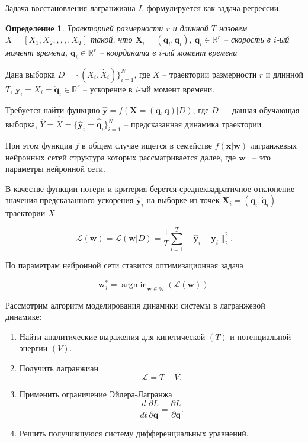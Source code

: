 \documentclass[a4paper, 12pt]{article}
\newcommand\argmin{\mathop{\arg\min}}
\newtheorem{definition}{Определение}
\begin{document}
Задача восстановления лагранжиана $L$ формулируется как задача регрессии.

\begin{definition} \label{definition:trajectory}
Траекторией размерности $r$ и длинной $T$ назовем $X = [X_1, X_2, ,,,, X_T]$ такой, что
$\mathbf{X}_i = (\mathbf{q}_i, \mathbf{\dot{q}}_i),\ \mathbf{\dot{q}}_i \in \mathbb{R}^r$ -- скорость в $i$-ый момент времени, $\mathbf{q}_i \in \mathbb{R}^r$ -- координата в $i$-ый момент времени
\end{definition}

Дана выборка
$D = \{(X_i, \dot{X_i})\}_{i=1}^N$, где $X$ -- траектории размерности $r$ и длинной $T$, $\mathbf{y}_i = \dot{X_i} = \ddot{\mathbf{q}}_i \in \mathbb{R}^r$ -- ускорение в $i$-ый момент времени.

Требуется найти функцию $\hat{\mathbf{y}}  = f(\mathbf{X} = (\mathbf{q}, \mathbf{\dot{q}}) | D)$, где $D$ ~-- данная обучающая выборка, $\hat{Y} =\hat{\dot{X}} = \{\hat{\mathbf{y}}_i = \hat{\ddot{\mathbf{q}}}_i\}_{i=1}^N$ -- предсказанная динамика траектории

При этом функция $f$ в общем случае ищется в семействе $f(\mathbf{x}|\mathbf{w})$ лагранжевых нейронных сетей структура которых рассматривается далее, где $\mathbf{w}$ ~-- это параметры нейронной сети.

В качестве функции потери и критерия берется среднеквадратичное отклонение значения предсказанного ускорения $\hat{\mathbf{y}}_i$ на выборке из точек $\mathbf{X}_i = (\mathbf{q}_i, \mathbf{\dot{q}}_i)$ траектории $X$

\begin{equation}
 \mathcal{L}(\textbf{w}) = \mathcal{L}(\mathbf{w} | D) = \frac{1}{T}\sum_{i=1}^{T} \| \hat{\mathbf{y}}_i - \mathbf{y}_i \|_2^2.
\end{equation}



По параметрам нейронной сети ставится оптимизационная задача

\begin{equation} 
\label{eq:opt_task}
\textbf{w}_j^* = \argmin_{\mathbf{w} \in \mathbb{W}} \left( \mathcal{L}(\textbf{w}) \right). 
\end{equation}


Рассмотрим алгоритм моделирования динамики системы в лагранжевой динамике:
\begin{enumerate}
	\item Найти аналитические выражения для кинетической $(T)$ и потенциальной энергии $(V)$.
	\item Получить лагранжиан \[\mathcal{L} = T - V .\]
	\item Применить ограничение Эйлера-Лагранжа \[\frac{d}{d t} \frac{\partial L}{\partial \mathbf{\dot{q}}} =\frac{\partial L}{\partial \mathbf{q}}.\]
	\item Решить получившуюся систему дифференциальных уравнений.
\end{enumerate}
\end{document}
